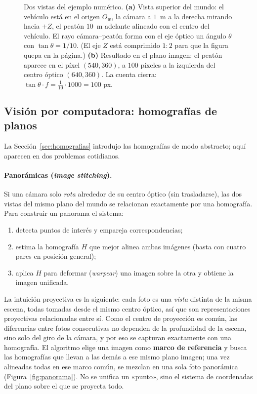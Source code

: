 \documentclass[11pt,a4paper]{article}
\begin{document}
\begin{figure}[H]
\caption{Dos vistas del ejemplo numérico. \textbf{(a)} Vista superior
del mundo: el vehículo está en el origen $O_w$, la cámara a $1$~m a la
derecha mirando hacia $+Z$, el peatón $10$~m adelante alineado con el
centro del vehículo. El rayo cámara--peatón forma con el eje óptico un
ángulo $\theta$ con $\tan\theta=1/10$. (El eje $Z$ está comprimido $1{:}2$
para que la figura quepa en la página.) \textbf{(b)} Resultado en el
plano imagen: el peatón aparece en el píxel $(540,360)$, a $100$ píxeles
a la izquierda del centro óptico $(640,360)$. La cuenta cierra:
$\tan\theta\cdot f = \tfrac{1}{10}\cdot 1000 = 100$ px.}
\label{fig:pinhole-numexample}
\end{figure}

\subsection{Visión por computadora: homografías de planos}
\label{sec:vision-homografia}

La Sección~\ref{sec:homografias} introdujo las homografías de modo
abstracto; aquí aparecen en dos problemas cotidianos.

\paragraph{Panorámicas (\emph{image stitching}).}
Si una cámara solo \emph{rota} alrededor de su centro óptico (sin
trasladarse), las dos vistas del mismo plano del mundo se relacionan
exactamente por una homografía. Para construir un panorama el sistema:
\begin{enumerate}[leftmargin=1.4em,itemsep=2pt]
\item detecta puntos de interés y empareja correspondencias;
\item estima la homografía $H$ que mejor alinea ambas imágenes (basta con
  cuatro pares en posición general);
\item aplica $H$ para deformar (\emph{warpear}) una imagen sobre la otra y
  obtiene la imagen unificada.
\end{enumerate}

La intuición proyectiva es la siguiente: cada foto es una \emph{vista}
distinta de la misma escena, todas tomadas desde el mismo centro óptico,
así que son representaciones proyectivas relacionadas entre sí. Como el
centro de proyección es común, las diferencias entre fotos consecutivas no
dependen de la profundidad de la escena, sino solo del giro de la cámara,
y por eso se capturan exactamente con una homografía. El algoritmo elige
una imagen como \textbf{marco de referencia} y busca las homografías que
llevan a las demás a ese mismo plano imagen; una vez alineadas todas en
ese marco común, se mezclan en una sola foto panorámica
(Figura~\ref{fig:panorama}). No se unifica un «punto», sino el sistema de
coordenadas del plano sobre el que se proyecta todo.
\end{document}

